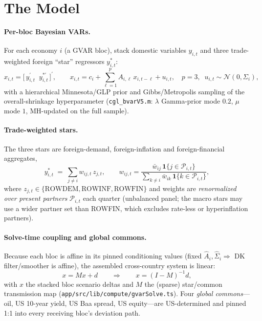 \documentclass[11pt]{article}
\begin{document}
\section{The Model}

\paragraph{Per-bloc Bayesian VARs.} For each economy $i$ (a GVAR bloc), stack domestic variables
$y_{i,t}$ and three trade-weighted foreign ``star'' regressors $y^{*}_{i,t}$:
\begin{equation}
  x_{i,t} = \big[\,y_{i,t}^{\prime}\;\; y^{*\prime}_{i,t}\,\big]^{\prime},
  \qquad
  x_{i,t} = c_i + \sum_{\ell=1}^{p} A_{i,\ell}\,x_{i,t-\ell} + u_{i,t},
  \quad p = 3,\;\; u_{i,t}\sim\mathcal{N}(0,\Sigma_i),
  \label{eq:bloc}
\end{equation}
with a hierarchical Minnesota/GLP prior \citep{GiannoneLenzaPrimiceri2019} and Gibbs/Metropolis
sampling of the overall-shrinkage hyperparameter (\texttt{cgl\_bvarV5.m}: $\lambda$ Gamma-prior mode
$0.2$, $\mu$ mode $1$, MH-updated on the full sample).

\paragraph{Trade-weighted stars.} The three stars are foreign-demand, foreign-inflation and
foreign-financial aggregates,
\begin{equation}
  y^{*}_{i,t}\;=\;\sum_{j\neq i} w_{ij,t}\, z_{j,t},
  \qquad
  w_{ij,t} = \frac{\bar w_{ij}\,\mathbf{1}\{j \in \mathcal{P}_{i,t}\}}{\sum_{k\neq i}\bar w_{ik}\,\mathbf{1}\{k\in\mathcal{P}_{i,t}\}},
  \label{eq:stars}
\end{equation}
where $z_{j,t}\in\{\text{ROWDEM},\text{ROWINF},\text{ROWFIN}\}$ and weights are \emph{renormalized over
present partners} $\mathcal{P}_{i,t}$ each quarter (unbalanced panel; the macro stars may use a wider
partner set than ROWFIN, which excludes rate-less or hyperinflation partners).

\paragraph{Solve-time coupling and global commons.} Because each bloc is affine in its pinned
conditioning values (fixed $\widehat A_i,\widehat\Sigma_i \Rightarrow$ DK filter/smoother is affine),
the assembled cross-country system is linear:
\begin{equation}
  x = M x + d
  \qquad\Longrightarrow\qquad
  x = (I - M)^{-1} d ,
  \label{eq:coupling}
\end{equation}
with $x$ the stacked bloc scenario deltas and $M$ the (sparse) star/common transmission map
(\texttt{app/src/lib/compute/gvarSolve.ts}). Four \emph{global commons}---oil, US 10-year yield, US
Baa spread, US equity---are US-determined and pinned 1:1 into every receiving bloc's deviation path.
\end{document}
